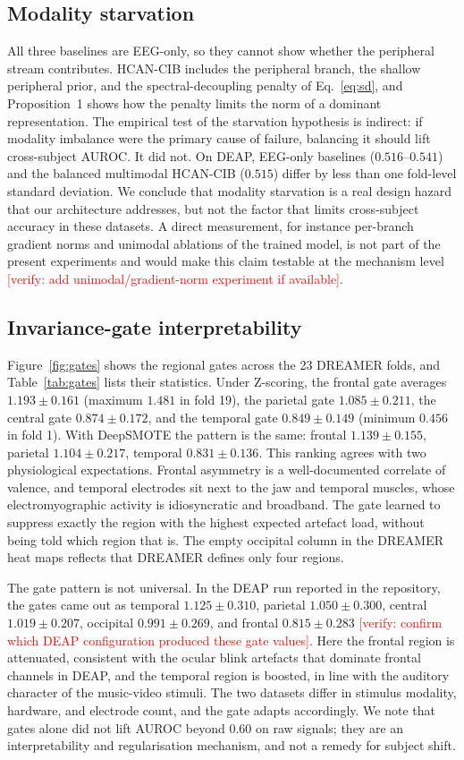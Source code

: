 \documentclass[a4paper,fleqn]{cas-sc}
\newcommand{\vrf}[1]{\textcolor{red}{[verify: #1]}}
\begin{document}
\subsection{Modality starvation}\label{sec:starv}
All three baselines are EEG-only, so they cannot show whether the peripheral stream contributes. HCAN-CIB includes the peripheral branch, the shallow peripheral prior, and the spectral-decoupling penalty of Eq.~\eqref{eq:sd}, and Proposition~1 shows how the penalty limits the norm of a dominant representation. The empirical test of the starvation hypothesis is indirect: if modality imbalance were the primary cause of failure, balancing it should lift cross-subject AUROC. It did not. On DEAP, EEG-only baselines ($0.516$--$0.541$) and the balanced multimodal HCAN-CIB ($0.515$) differ by less than one fold-level standard deviation. We conclude that modality starvation is a real design hazard that our architecture addresses, but not the factor that limits cross-subject accuracy in these datasets. A direct measurement, for instance per-branch gradient norms and unimodal ablations of the trained model, is not part of the present experiments and would make this claim testable at the mechanism level \vrf{add unimodal/gradient-norm experiment if available}.

\subsection{Invariance-gate interpretability}
Figure~\ref{fig:gates} shows the regional gates across the 23 DREAMER folds, and Table~\ref{tab:gates} lists their statistics. Under Z-scoring, the frontal gate averages $1.193\pm0.161$ (maximum $1.481$ in fold 19), the parietal gate $1.085\pm0.211$, the central gate $0.874\pm0.172$, and the temporal gate $0.849\pm0.149$ (minimum $0.456$ in fold 1). With DeepSMOTE the pattern is the same: frontal $1.139\pm0.155$, parietal $1.104\pm0.217$, temporal $0.831\pm0.136$. This ranking agrees with two physiological expectations. Frontal asymmetry is a well-documented correlate of valence, and temporal electrodes sit next to the jaw and temporal muscles, whose electromyographic activity is idiosyncratic and broadband. The gate learned to suppress exactly the region with the highest expected artefact load, without being told which region that is. The empty occipital column in the DREAMER heat maps reflects that DREAMER defines only four regions.

The gate pattern is not universal. In the DEAP run reported in the repository, the gates came out as temporal $1.125\pm0.310$, parietal $1.050\pm0.300$, central $1.019\pm0.207$, occipital $0.991\pm0.269$, and frontal $0.815\pm0.283$ \vrf{confirm which DEAP configuration produced these gate values}. Here the frontal region is attenuated, consistent with the ocular blink artefacts that dominate frontal channels in DEAP, and the temporal region is boosted, in line with the auditory character of the music-video stimuli. The two datasets differ in stimulus modality, hardware, and electrode count, and the gate adapts accordingly. We note that gates alone did not lift AUROC beyond $0.60$ on raw signals; they are an interpretability and regularisation mechanism, and not a remedy for subject shift.
\end{document}
